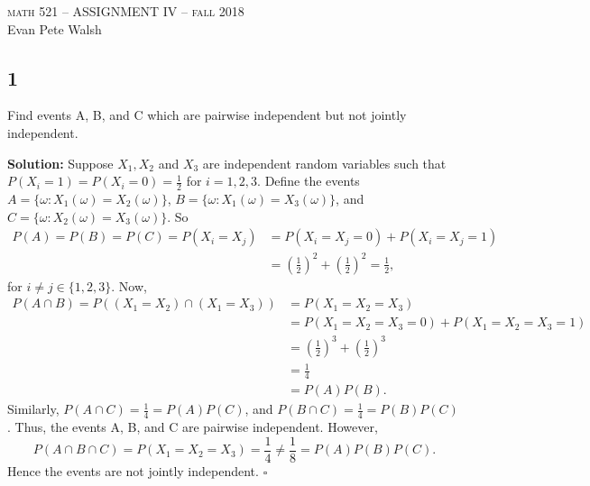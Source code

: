 \documentclass[12pt]{article}
\newcounter{ProofCounter}
\newenvironment{Solution}{\stepcounter{ProofCounter}\textbf{Solution:}}{\hfill$\square$}
\begin{document}
\thispagestyle{empty}
\begin{center}
  \Large \textsc{math 521 -- ASSIGNMENT IV -- fall 2018} \\ 
  \vspace{5mm}
  \large Evan Pete Walsh
\end{center}


\subsection*{1}
\begin{tcolorbox}
  Find events A, B, and C which are pairwise independent but not jointly independent.
\end{tcolorbox}
\begin{Solution}
  Suppose $X_1, X_2$ and $X_3$ are independent random variables such that $P(X_i = 1) = P(X_i = 0) = \frac{1}{2}$ for $i = 1, 2, 3$. Define the events $A = \{ \omega : X_1(\omega) = X_2(\omega) \}$, $B = \{ \omega : X_1(\omega) = X_3(\omega) \}$, and $C = \{ \omega : X_2(\omega) = X_3(\omega) \}$. So
  \begin{align*}
    P(A) = P(B) = P(C) = P(X_i = X_j) & = P(X_i = X_j = 0) + P(X_i = X_j = 1) \\
    & = \left( \frac{1}{2} \right)^2 + \left( \frac{1}{2} \right)^2 = \frac{1}{2},
  \end{align*}
  for $i \neq j \in \{ 1, 2, 3 \}$. Now,
  \begin{align*}
    P(A \cap B) = P((X_1 = X_2) \cap (X_1 = X_3)) & = P(X_1 = X_2 = X_3) \\
    & = P(X_1 = X_2 = X_3 = 0) + P(X_1 = X_2 = X_3 = 1) \\
    & = \left( \frac{1}{2} \right)^3 + \left( \frac{1}{2} \right)^3 \\
    & = \frac{1}{4} \\
    & = P(A)P(B).
  \end{align*}
  Similarly, $P(A \cap C) = \frac{1}{4} = P(A)P(C)$, and $P(B\cap C) = \frac{1}{4} = P(B)P(C)$. Thus, the events A, B, and C are pairwise independent. However,
  \[
    P(A \cap B \cap C) = P(X_1 = X_2 = X_3) = \frac{1}{4} \neq \frac{1}{8} = P(A)P(B)P(C).
  \]
  Hence the events are not jointly independent.
\end{Solution}
\end{document}
